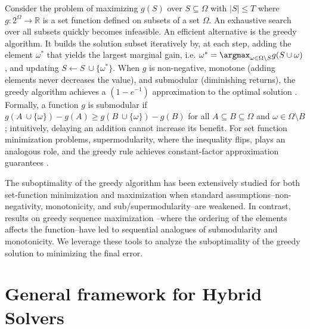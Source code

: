 \documentclass{article} %
\begin{document}
Consider the problem of maximizing $g(S)$ over $S\subseteq \Omega$ with $|S| \leq T$ where $g: 2^{\Omega} \to \mathbb{R}$ is a set function defined on subsets of a set $\Omega$. An exhaustive search over all subsets quickly becomes infeasible. An efficient alternative is the greedy algorithm. It builds the solution subset iteratively by, at each step, adding the element $\omega^*$ that yields the largest marginal gain, i.e. $\omega^* =  \argmax_{\omega \in \Omega \setminus S} g(S \cup \omega)$, and updating $S \leftarrow S \ \cup \{\omega^*\}$. When $g$ is non-negative, monotone (adding elements never decreases the value), and submodular (diminishing returns), the greedy algorithm achieves a $(1 - e^{-1})$ approximation to the optimal solution \citep{nemhauser1978analysis}. Formally, a function $g$ is submodular if $g(A \ \cup \{\omega\}) - g(A) \geq g(B \ \cup \{\omega\}) - g(B)$ for all $A \subseteq B \subseteq \Omega$ and $\omega \in \Omega \setminus B$; intuitively, delaying an addition cannot increase its benefit. For set function minimization problems, supermodularity, where the inequality flips, plays an analogous role, and the greedy rule achieves constant-factor approximation guarantees \citep{liberty2017greedy}.

The suboptimality of the greedy algorithm has been extensively studied for both set-function minimization \citep{bounia2023approximating}  and maximization \citep{das2018approximate,feige2011maximizing,bian2017guarantees,harshaw2019submodular} when standard assumptions--non-negativity, monotonicity, and sub/supermodularity--are weakened. In contrast, results on greedy sequence maximization \citep{streeter2008online,alaei2021maximizing,zhang2015string,bernardini2020through,van2024performance,tschiatschek2017selecting}--where the ordering of the elements affects the function--have led to sequential analogues of submodularity and monotonicity. We leverage these tools to analyze the suboptimality of the greedy solution to minimizing the final error.


\section{General framework for Hybrid Solvers}

\end{document}
